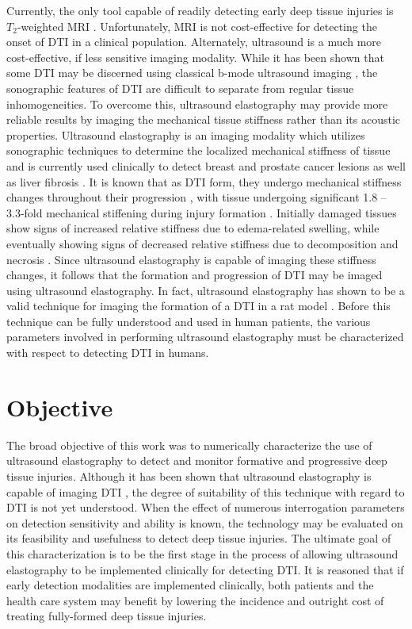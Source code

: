 		Currently, the only tool capable of readily detecting early deep tissue injuries is $T_2$-weighted MRI \cite{stekelenburg06,loerakker11}. Unfortunately, MRI is not cost-effective for detecting the onset of DTI in a clinical population. Alternately, ultrasound is a much more cost-effective, if less sensitive imaging modality. While it has been shown that some DTI may be discerned using classical b-mode ultrasound imaging \cite{aoi08, kanno09}, the sonographic features of DTI are difficult to separate from regular tissue inhomogeneities. To overcome this, ultrasound elastography may provide more reliable results by imaging the mechanical tissue stiffness rather than its acoustic properties. Ultrasound elastography is an imaging modality which utilizes sonographic techniques to determine the localized mechanical stiffness of tissue and is currently used clinically to detect breast and prostate cancer lesions \cite{tanter08, konig05} as well as liver fibrosis \cite{sandrin03}. It is known that as DTI form, they undergo mechanical stiffness changes throughout their progression \cite{linderganz04,oomens10,solis12-03}, with tissue undergoing significant 1.8 -- 3.3-fold mechanical stiffening during injury formation \cite{gefen05}. Initially damaged tissues show signs of increased relative stiffness due to edema-related swelling, while eventually showing signs of decreased relative stiffness due to decomposition and necrosis \cite{gefen09}. Since ultrasound elastography is capable of imaging these stiffness changes, it follows that the formation and progression of DTI may be imaged using ultrasound elastography. In fact, ultrasound elastography has shown to be a valid technique for imaging the formation of a DTI in a rat model \cite{deprez11}. Before this technique can be fully understood and used in human patients, the various parameters involved in performing ultrasound elastography must be characterized with respect to detecting DTI in humans.

	\section{Objective}
		The broad objective of this work was to numerically characterize the use of ultrasound elastography to detect and monitor formative and progressive deep tissue injuries. Although it has been shown that ultrasound elastography is capable of imaging DTI \cite{deprez11}, the degree of suitability of this technique with regard to DTI is not yet understood. When the effect of numerous interrogation parameters on detection sensitivity and ability is known, the technology may be evaluated on its feasibility and usefulness to detect deep tissue injuries. The ultimate goal of this characterization is to be the first stage in the process of allowing ultrasound elastography to be implemented clinically for detecting DTI. It is reasoned that if early detection modalities are implemented clinically, both patients and the health care system may benefit by lowering the incidence and outright cost of treating fully-formed deep tissue injuries.

